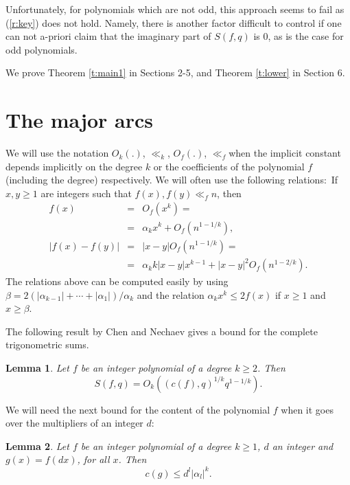 \documentclass{amsart}
\newtheorem {lemma}{Lemma}
\numberwithin {equation}{section}
\begin{document}
Unfortunately, for polynomials which are not odd, this approach seems to
fail as (\ref{r:key}) does not hold. Namely, there is another factor
difficult to control if one can not a-priori claim that the imaginary part
of $S(f,q)$ is $0$, as is the case for odd polynomials.

We prove Theorem \ref{t:main1} in Sections 2-5, and Theorem \ref{t:lower} in
Section 6.

\section{The major arcs}

We will use the notation $O_{k}(.)$, $\ll _{k}$, $O_{f}(.)$, $\ll _{f}$when
the implicit constant depends implicitly on the degree $k$ or the
coefficients of the polynomial $f$ (including the degree) respectively. We
will often use the following relations:\ If $x,y\geq 1$ are integers such
that $f(x),f(y)\ll _fn$, then 
\begin{eqnarray}
f(x)&=&O_{f}(x^{k})=  \label{r:pol1} \\
&=&\alpha _{k}x^{k}+O_{f}(n^{1-1/k}),  \label{r:pol1A} \\
|f(x)-f(y)|&=&|x-y|O_{f}(n^{1-1/k})=  \label{r:pol2} \\
&=&\alpha _{k}k|x-y|x^{k-1}+|x-y|^{2}O_{f}(n^{1-2/k}).  \label{r:pol2A}
\end{eqnarray}
The relations above can be computed easily by using $\beta =2(|\alpha
_{k-1}|+\cdots +|\alpha _1|)/\alpha _k$ and the relation $\alpha _kx^k\leq
2f(x)$ if $x\geq 1$ and $x\geq \beta $.

The following result by Chen \cite{Chen:77} and Nechaev \cite{Nechaev:75}
gives a bound for the complete trigonometric sums.

\begin{lemma}
\label{l:cn}Let $f$ be an integer polynomial of a degree $k\geq 2$. Then 
\begin{equation*}
S(f,q)=O_{k}((c(f),q)^{1/k}q^{1-1/k}).
\end{equation*}
\end{lemma}

We will need the next bound for the content of the polynomial $f$ when it
goes over the multipliers of an integer $d$:

\begin{lemma}
\label{l:content}Let $f$ be an integer polynomial of a degree $k\geq 1$, $d$
an integer and $g(x)=f(dx)$, for all $x$. Then 
\begin{equation*}
c(g)\leq d^{l}|\alpha _{l}|^{k}.
\end{equation*}
\end{lemma}
\end{document}
